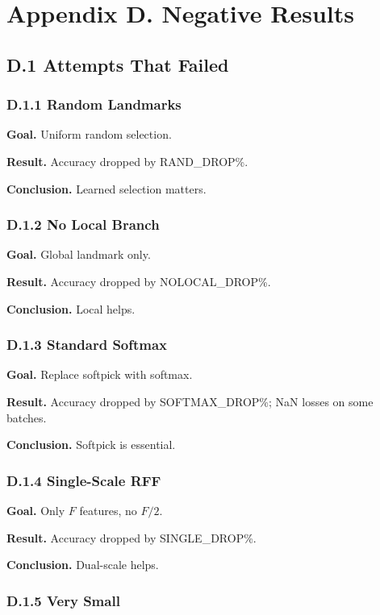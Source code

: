\section{Appendix D. Negative Results}

\subsection{D.1 Attempts That Failed}

\subsubsection{D.1.1 Random Landmarks}

\textbf{Goal.} Uniform random selection.

\textbf{Result.} Accuracy dropped by {{RAND\_DROP}}\%.

\textbf{Conclusion.} Learned selection matters.

\subsubsection{D.1.2 No Local Branch}

\textbf{Goal.} Global landmark only.

\textbf{Result.} Accuracy dropped by {{NOLOCAL\_DROP}}\%.

\textbf{Conclusion.} Local helps.

\subsubsection{D.1.3 Standard Softmax}

\textbf{Goal.} Replace softpick with softmax.

\textbf{Result.} Accuracy dropped by {{SOFTMAX\_DROP}}\%; NaN losses on some 
batches.

\textbf{Conclusion.} Softpick is essential.

\subsubsection{D.1.4 Single-Scale RFF}

\textbf{Goal.} Only $F$ features, no $F/2$.

\textbf{Result.} Accuracy dropped by {{SINGLE\_DROP}}\%.

\textbf{Conclusion.} Dual-scale helps.

\subsubsection{D.1.5 Very Small}

